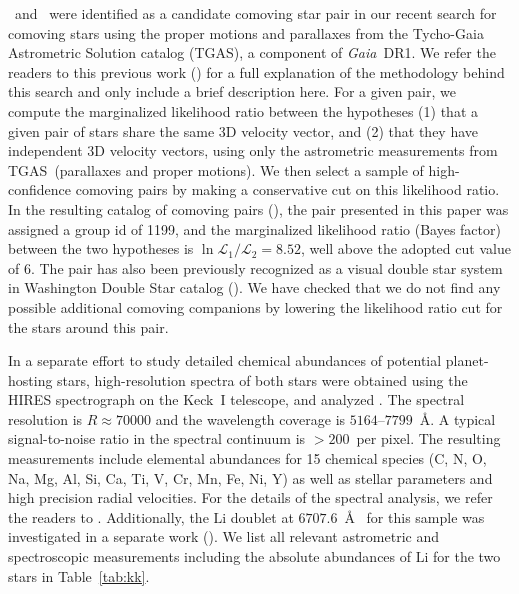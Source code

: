 \documentclass[modern, letterpaper]{aastex61}
\newcommand{\project}[1]{\textsl{#1}}
\newcommand{\acronym}[1]{{\small{#1}}}
\newcommand{\gaia}{\project{Gaia}}
\newcommand{\figname}{Figure}
\newcommand{\dr}{\acronym{DR1}}
\newcommand{\tgas}{\acronym{TGAS}}
\newcommand*\elem[1]{\ensuremath{\mathrm{#1}}}
\newcommand{\sunanalog}{\text{Krios}}
\newcommand{\bizarreone}{\text{Kronos}}
\begin{document}
\sunanalog\ and \bizarreone\ were identified as a candidate comoving star pair
in our recent search for comoving stars using the proper motions and parallaxes
from the Tycho-Gaia Astrometric Solution catalog (\tgas), a component of \gaia\
\dr.
We refer the readers to this previous work (\citealt{2017AJ....153..257O}) for a
full explanation of the methodology behind this search and only include
a brief description here.
For a given pair, we compute the marginalized likelihood ratio between the
hypotheses (1) that a given pair of stars share the same 3D velocity vector,
and (2) that they have independent 3D velocity vectors, using only the
astrometric measurements from \tgas\ (parallaxes and proper motions).
We then select a sample of high-confidence comoving pairs by making a
conservative cut on this likelihood ratio.
In the resulting catalog of comoving pairs (\citealt{2017AJ....153..257O}),
the pair presented in this paper was assigned a group id of 1199,
and the marginalized likelihood ratio (Bayes factor)
between the two hypotheses is $\ln{\mathcal{L}_1/\mathcal{L}_2} = 8.52$,
well above the adopted cut value of 6.
The pair has also been previously recognized as a visual double star system
in Washington Double Star catalog (\citealt{2001AJ....122.3466M}).
We have checked that we do not find any possible additional comoving companions
by lowering the likelihood ratio cut for the stars around this pair.

In a separate effort to study detailed chemical abundances of potential
planet-hosting stars, high-resolution spectra of both stars were obtained using
the HIRES spectrograph on the Keck~I telescope, and analyzed
\citep{2016ApJS..225...32B}.
The spectral resolution is $R\approx 70000$ and the wavelength coverage is
$5164$--$7799$~\AA.
A typical signal-to-noise ratio in the spectral continuum is $>200$~per pixel.
The resulting measurements include elemental abundances for 15 chemical species
(C, N, O, Na, Mg, Al, Si, Ca, Ti, V, Cr, Mn, Fe, Ni, Y) as well as stellar parameters
and high precision radial velocities.
For the details of the spectral analysis, we refer the readers to
\citealt{2016ApJS..225...32B}.
Additionally, the \elem{Li} doublet at $6707.6$~\AA\
for this sample was investigated in a separate work (\citealt{jmlithium}).
We list all relevant astrometric and spectroscopic measurements including the
absolute abundances of \elem{Li} for the two stars in Table~\ref{tab:kk}.
\end{document}

